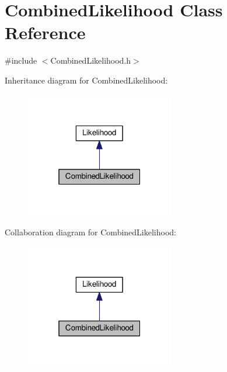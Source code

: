 \hypertarget{classCombinedLikelihood}{\section{Combined\-Likelihood Class Reference}
\label{classCombinedLikelihood}
}


{\ttfamily \#include $<$Combined\-Likelihood.\-h$>$}



Inheritance diagram for Combined\-Likelihood\-:
\nopagebreak
\begin{figure}[H]
\begin{center}
\leavevmode
\includegraphics[width=184pt]{classCombinedLikelihood__inherit__graph}
\end{center}
\end{figure}


Collaboration diagram for Combined\-Likelihood\-:
\nopagebreak
\begin{figure}[H]
\begin{center}
\leavevmode
\includegraphics[width=184pt]{classCombinedLikelihood__coll__graph}
\end{center}
\end{figure}
